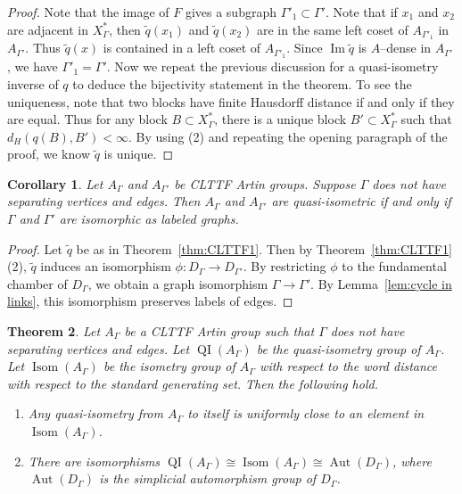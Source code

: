 \documentclass[11pt]{amsart}
\newcommand{\QI}{\operatorname{QI}}
\newcommand{\Isom}{\operatorname{Isom}}
\newcommand{\Aut}{\operatorname{Aut}}
\newtheorem{theorem}{Theorem}[section]
\newtheorem{corollary}[theorem]{Corollary}
\theoremstyle{definition}
\newcommand{\Xa}{X^{\ast}}
\newcommand{\im}{\operatorname{Im}}
\begin{document}
\begin{proof}
Note that the image of $F$ gives a subgraph $\Gamma'_1\subset\Gamma'$. Note that if $x_1$ and $x_2$ are adjacent in $\Xa_\Gamma$, then $\tilde q(x_1)$ and $\tilde q(x_2)$ are in the same left coset of $A_{\Gamma'_1}$ in $A_{\Gamma'}$. Thus $\tilde q(x)$ is contained in a left coset of $A_{\Gamma'_1}$. Since $\im \tilde q$ is $A$--dense in $A_{\Gamma'}$, we have $\Gamma'_1=\Gamma'$. Now we repeat the previous discussion for a quasi-isometry inverse of $q$ to deduce the bijectivity statement in the theorem. To see the uniqueness, note that two blocks have finite Hausdorff distance if and only if they are equal. Thus for any block $B\subset \Xa_\Gamma$, there is a unique block $B'\subset \Xa_\Gamma$ such that $d_H(q(B),B')<\infty$. By using (2) and repeating the opening paragraph of the proof, we know $\tilde q$ is unique.
\end{proof}

\begin{corollary}
	\label{cor:qi and iso}
Let $A_\Gamma$ and $A_{\Gamma'}$ be CLTTF Artin groups. Suppose $\Gamma$ does not have separating vertices and edges. Then $A_\Gamma$ and $A_{\Gamma'}$ are quasi-isometric if and only if $\Gamma$ and $\Gamma'$ are isomorphic as labeled graphs. 
\end{corollary}

\begin{proof}
Let $\tilde q$ be as in Theorem~\ref{thm:CLTTF1}. Then by Theorem~\ref{thm:CLTTF1} (2), $\tilde q$ induces an isomorphism $\phi\colon D_\Gamma\to D_{\Gamma'}$. By restricting $\phi$ to the fundamental chamber of $D_\Gamma$, we obtain a graph isomorphism $\Gamma\to\Gamma'$. By Lemma~\ref{lem:cycle in links}, this isomorphism preserves labels of edges.
\end{proof}

\begin{theorem}
	\label{thm:CLTTF2}
Let $A_\Gamma$ be a CLTTF Artin group such that $\Gamma$ does not have separating vertices and edges. Let $\QI(A_\Gamma)$ be the quasi-isometry group of $A_\Gamma$. Let $\Isom(A_\Gamma)$ be the isometry group of $A_\Gamma$ with respect to the word distance with respect to the standard generating set. Then the following hold.
\begin{enumerate}
	\item Any quasi-isometry from $A_\Gamma$ to itself is uniformly close to an element in $\Isom(A_\Gamma)$.
	\item There are isomorphisms $\QI(A_\Gamma)\cong \Isom(A_\Gamma)\cong \Aut(D_\Gamma)$, where $\Aut(D_\Gamma)$ is the simplicial automorphism group of $D_\Gamma$.
\end{enumerate}
\end{theorem}
\end{document}
